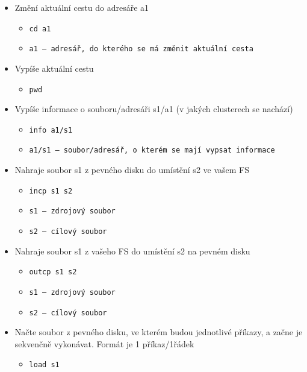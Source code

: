 \documentclass[12pt, a4paper]{article}
\begin{document}
\begin{itemize}[itemsep=-5pt]
    \begin{itemize}
        \item[] \texttt{cat s1}
        \item[] \texttt{s1 -- soubor, jehož obsah se má vypsat}
    \end{itemize}
    \item Změní aktuální cestu do adresáře a1
    \begin{itemize}
        \item[] \texttt{cd a1}
        \item[] \texttt{a1 -- adresář, do kterého se má změnit aktuální cesta}
    \end{itemize}
    \item Vypíše aktuální cestu
    \begin{itemize}
        \item[] \texttt{pwd}
    \end{itemize}
    \item Vypíše informace o souboru/adresáři s1/a1 (v jakých clusterech se nachází)
    \begin{itemize}
        \item[] \texttt{info a1/s1}
        \item[] \texttt{a1/s1 -- soubor/adresář, o kterém se mají vypsat informace}
    \end{itemize}
    \item Nahraje soubor s1 z pevného disku do umístění s2 ve vašem FS
    \begin{itemize}
        \item[] \texttt{incp s1 s2}
        \item[] \texttt{s1 -- zdrojový soubor}
        \item[] \texttt{s2 -- cílový soubor}
    \end{itemize}
    \item Nahraje soubor s1 z vašeho FS do umístění s2 na pevném disku
    \begin{itemize}
        \item[] \texttt{outcp s1 s2}
        \item[] \texttt{s1 -- zdrojový soubor}
        \item[] \texttt{s2 -- cílový soubor}
    \end{itemize}
    \item Načte soubor z pevného disku, ve kterém budou jednotlivé příkazy, a začne je sekvenčně vykonávat. Formát je 1 příkaz/1řádek
    \begin{itemize}
        \item[] \texttt{load s1}

\end{itemize}
\end{itemize}
\end{document}
